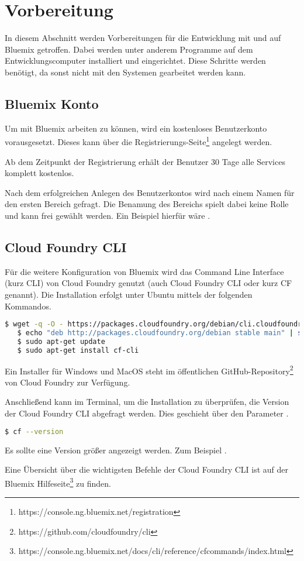\section{Vorbereitung}
In diesem Abschnitt werden Vorbereitungen für die Entwicklung mit und auf Bluemix getroffen. Dabei werden unter anderem
Programme auf dem Entwicklungscomputer installiert und eingerichtet. Diese Schritte werden benötigt, da sonst nicht mit
den Systemen gearbeitet werden kann.

\subsection{Bluemix Konto}
Um mit Bluemix arbeiten zu können, wird ein kostenloses Benutzerkonto vorausgesetzt. Dieses kann über die
Registrierungs-Seite\footnote{https://console.ng.bluemix.net/registration} angelegt werden.

Ab dem Zeitpunkt der Registrierung erhält der Benutzer 30 Tage alle Services komplett kostenlos.

Nach dem erfolgreichen Anlegen des Benutzerkontos wird nach einem Namen für den ersten Bereich gefragt. Die Benamung des
Bereichs spielt dabei keine Rolle und kann frei gewählt werden. Ein Beispiel hierfür wäre .

\subsection{Cloud Foundry CLI}
Für die weitere Konfiguration von Bluemix wird das Command Line Interface (kurz CLI) von Cloud Foundry genutzt (auch
Cloud Foundry CLI oder kurz CF genannt). Die Installation erfolgt unter Ubuntu mittels der folgenden Kommandos.

\begin{lstlisting}[language=bash, caption=Installieren der Cloud Foundry CLI, label=Installieren der Cloud Foundry CLI]
   $ wget -q -O - https://packages.cloudfoundry.org/debian/cli.cloudfoundry.org.key | sudo apt-key add -
   $ echo "deb http://packages.cloudfoundry.org/debian stable main" | sudo tee /etc/apt/sources.list.d/cloudfoundry-cli.list
   $ sudo apt-get update
   $ sudo apt-get install cf-cli
\end{lstlisting}

Ein Installer für Windows und MacOS steht im öffentlichen GitHub-Repository\footnote{https://github.com/cloudfoundry/cli}
von Cloud Foundry zur Verfügung.

Anschließend kann im Terminal, um die Installation zu überprüfen, die Version der Cloud Foundry CLI abgefragt werden. Dies
geschieht über den Parameter .

\begin{lstlisting}[language=bash, caption=Version der Cloud Foundry CLI überprüfen, label=Version der Cloud Foundry CLI überprüfen]
   $ cf --version
\end{lstlisting}

Es sollte eine Version größer  angezeigt werden. Zum Beispiel .

Eine Übersicht über die wichtigsten Befehle der Cloud Foundry CLI ist auf der Bluemix
Hilfeseite\footnote{https://console.ng.bluemix.net/docs/cli/reference/cfcommands/index.html} zu finden.